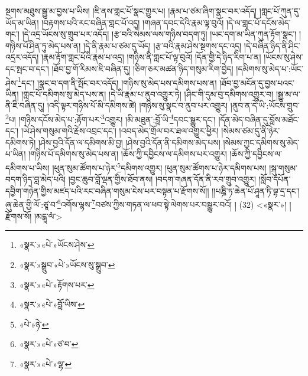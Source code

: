སྔགས་མཐུས་སྒྱུ་མ་བྱས་པ་ཡིས། །ཇི་ནས་གླང་པོ་སྣང་གྱུར་པ། །རྣམ་པ་ཙམ་ཞིག་སྣང་བར་འདོད། །གླང་པོ་ཀུན་དུ་ཡོད་མ་ཡིན། །བརྟགས་པའི་རང་བཞིན་གླང་པོ་འདྲ། །གཞན་དབང་དེའི་རྣམ་ལྟ་བུའོ། །དེ་ལ་གླང་པོ་དངོས་མེད་གང་། །དེ་འདྲ་ཡོངས་སུ་གྲུབ་པར་འདོད། །རྩ་བའི་སེམས་ལས་གཉིས་བདག་ཏུ། །ཡང་དག་མ་ཡིན་ཀུན་རྟོག་སྣང་། །གཉིས་པོ་ཤིན་ཏུ་མེད་པས་ན། །དེ་ནི་རྣམ་པ་ཙམ་དུ་ཡོད། །རྩ་བའི་རྣམ་ཤེས་སྔགས་དང་འདྲ། །དེ་བཞིན་ཉིད་ནི་ཤིང་འདྲར་འདོད། །རྣམ་རྟོག་གླང་པོའི་རྣམ་པ་འདྲ། །གཉིས་ནི་གླང་པོ་ལྟ་བུའོ། །དོན་གྱི་དེ་ཉིད་རིག་པ་ན། །ཡོངས་སུ་ཤེས་དང་སྤང་བ་དང་། །ཐོབ་བྱ་གོ་རིམས་ཇི་བཞིན་དུ། །ཅིག་ཅར་མཚན་ཉིད་གསུམ་རིག་བྱེད། །དམིགས་སུ་མེད་པ་:ཡོང་ཤེས་\footnote{«སྣར་»«པེ་»ཡོངས་ཤེས་}དང་། །སྣང་བ་དག་ནི་སྤོང་བར་འདོད། །གཉིས་སུ་མེད་པས་དམིགས་པས་ན། །ཐོབ་བྱ་མངོན་དུ་བྱས་པའང་ཡིན། །གླང་པོ་དམིགས་སུ་མེད་པས་ན། །དེ་ཡི་རྣམ་པ་ནུབ་འགྱུར་ཏེ། །ཤིང་གི་དུམ་བུ་དམིགས་འགྱུར་བ། །སྒྱུ་མ་ལ་ནི་ཇི་བཞིན་དུ། །འདི་ལྟར་གཉིས་པོ་མི་དམིགས་ཚེ། །གཉིས་སུ་སྣང་བ་ནུབ་པར་འགྱུར། །ནུབ་ན་དེ་ཡི་:ཡོངས་གྲུབ་\footnote{«སྣར་»སྒྲུབ་«པེ་»ཡོངས་སུ་སྒྲུབ་}པ། །གཉིས་དངོས་མེད་པ་:རྟོག་པར་\footnote{«སྣར་»«པེ་»རྟོགས་པར་}འགྱུར། །མི་མཐུན་:བློ་ཡི་\footnote{«སྣར་»«པེ་»བློ་ཡིས་}དབང་སྒྱུར་དང་། །དོན་མེད་བཞིན་དུ་བློས་མཐོང་དང་། །ཡེ་ཤེས་གསུམ་གའི་རྗེས་འབྲང་དང་། །འབད་མེད་གྲོལ་བར་ཐལ་འགྱུར་ཕྱིར། །སེམས་ཙམ་དུ་ནི་ཉེར་དམིགས་ཏེ། །ཤེས་བྱའི་དོན་ལ་དམིགས་མི་བྱ། །ཤེས་བྱའི་དོན་ནི་དམིགས་མེད་པས། །སེམས་ཀྱང་དམིགས་སུ་མེད་པ་ཡིན། །གཉིས་པོ་དམིགས་སུ་མེད་པས་ན། །ཆོས་ཀྱི་དབྱིངས་ལ་དམིགས་པར་འགྱུར། །ཆོས་ཀྱི་དབྱིངས་ལ་དམིགས་པ་ཡིས། །ཕུན་སུམ་ཚོགས་པ་ཉེར་\footnote{«པེ་»ཉེ་}དམིགས་འགྱུར། །ཕུན་སུམ་ཚོགས་པ་ཉེར་དམིགས་པས། །སྐུ་གསུམ་བདག་ཉིད་བླ་མེད་པའི། །བྱང་ཆུབ་བློ་ལྡན་གྱིས་ཐོབ་ནས། །བདག་གཞན་དོན་ནི་རབ་གྲུབ་འགྱུར། །སློབ་དཔོན་དབྱིག་གཉེན་གྱིས་མཛད་པའི་རང་བཞིན་གསུམ་ངེས་པར་བསྟན་པ་རྫོགས་སོ།། །།པཎྜི་ཏ་ཆེན་པོ་ཤཱན་ཏི་བྷ་དྲ་དང་། ཞུ་ཆེན་གྱི་ལོ་:ཙཱ་བ་\footnote{«སྣར་»«པེ་»ཙ་བ་}འགོས་ལྷས་\footnote{«སྣར་»«པེ་»ལྷ་}བཙས་ཀྱིས་གཏན་ལ་ཕབ་སྟེ་ལེགས་པར་བསྒྱུར་བའོ། ། (32) <«སྣར་»། །
 རྫོགས་སོ། །མངྒཱ་ལཾ་>